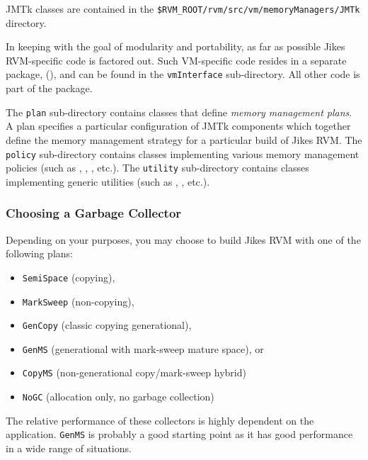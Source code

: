 JMTk classes are contained in the
\texttt{\$RVM\_ROOT/rvm/src/vm/memoryManagers/JMTk} directory.

In keeping with the goal of modularity and portability, as far as
possible Jikes RVM-specific code is factored out.  Such VM-specific
code resides in a separate package,
(),
and can be found in the \texttt{vmInterface} sub-directory.  All other
code is part of the
package.

The \texttt{plan} sub-directory contains classes that define
\emph{memory management plans}.  A plan specifies a particular
configuration of JMTk components which together define the memory
management strategy for a particular build of Jikes RVM.  The
\texttt{policy} sub-directory contains classes implementing various
memory management policies (such as , , , etc.).  The \texttt{utility}
sub-directory contains classes implementing generic utilities (such as
,
, etc.).

\subsubsection{Choosing a Garbage Collector} \label{ssec:choosinggc}

Depending on your purposes, you may choose to build Jikes RVM with one
of the following plans:
\begin{itemize}
\item \texttt{SemiSpace} (copying),
\item \texttt{MarkSweep} (non-copying),
\item \texttt{GenCopy} (classic copying generational),
\item \texttt{GenMS} (generational with mark-sweep mature space), or
\item \texttt{CopyMS} (non-generational copy/mark-sweep hybrid)
\item \texttt{NoGC} (allocation only, no garbage collection)
\end{itemize}
The relative performance of these collectors is highly dependent on
the application.  \texttt{GenMS} is probably a good starting point as
it has good performance in a wide range of situations.


